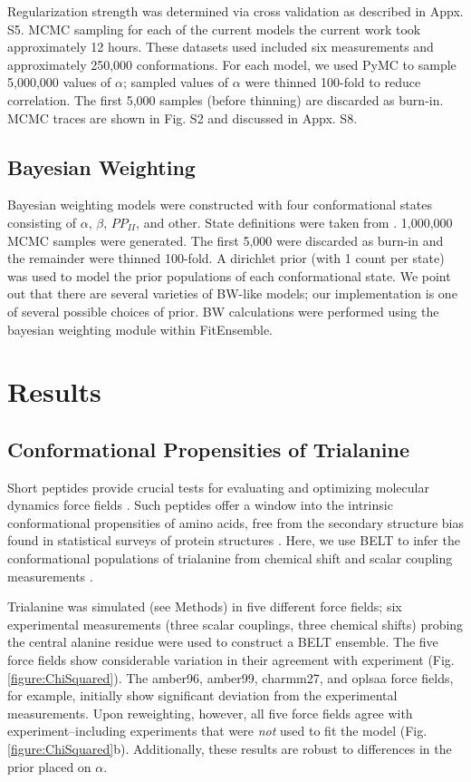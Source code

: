 \documentclass[11pt,titlepage]{article}
\begin{document}
Regularization strength was determined via cross validation as described in Appx. S5.  MCMC sampling for each of the current models the current work took approximately 12 hours.  These datasets used included six measurements and approximately 250,000 conformations.  For each model, we used PyMC to sample 5,000,000 values of $\alpha$; sampled values of $\alpha$ were thinned 100-fold to reduce correlation.  The first 5,000 samples (before thinning) are discarded as burn-in.  MCMC traces are shown in Fig. S2 and discussed in Appx. S8.  

\subsection*{Bayesian Weighting}

Bayesian weighting models were constructed with four conformational states consisting of $\alpha$, $\beta$, $PP_{II}$, and other.  State definitions were taken from \citep{jha}.  1,000,000 MCMC samples were generated.  The first 5,000 were discarded as burn-in and the remainder were thinned 100-fold.  A dirichlet prior (with 1 count per state) was used to model the prior populations of each conformational state.  We point out that there are several varieties of BW-like models; our implementation is one of several possible choices of prior.  BW calculations were performed using the bayesian weighting module within FitEnsemble.  

\section*{Results}

\subsection*{Conformational Propensities of Trialanine}

Short peptides provide crucial tests for evaluating and optimizing molecular dynamics force fields \citep{Graf2007,beauchamp2012protein, Nerenberg2011, Best2008, Grdadolnik2011}.  Such peptides offer a window into the intrinsic conformational propensities of amino acids, free from the secondary structure bias found in statistical surveys of protein structures \citep{Jha2005}.  Here, we use BELT to infer the conformational populations of trialanine from chemical shift and scalar coupling measurements \citep{Graf2007}.  

Trialanine was simulated (see Methods) in five different force fields; six experimental measurements (three scalar couplings, three chemical shifts) probing the central alanine residue were used to construct a BELT ensemble.  The five force fields show considerable variation in their agreement with experiment (Fig. \ref{figure:ChiSquared}).  The amber96, amber99, charmm27, and oplsaa force fields, for example, initially show significant deviation from the experimental measurements.  Upon reweighting, however, all five force fields agree with experiment--including experiments that were \emph{not} used to fit the model (Fig. \ref{figure:ChiSquared}b).  Additionally, these results are robust to differences in the prior placed on $\alpha$.
\end{document}
